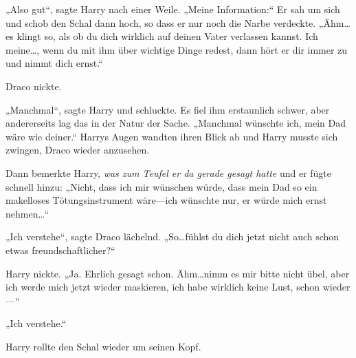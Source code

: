 „Also gut“, sagte Harry nach einer Weile. „Meine Information:“ Er sah um sich und schob den Schal dann hoch, so dass er nur noch die Narbe verdeckte. „Ähm…es klingt so, als ob du dich wirklich auf deinen Vater verlassen kannst. Ich meine…, wenn du mit ihm über wichtige Dinge redest, dann hört er dir immer zu und nimmt dich ernst.“

Draco nickte.

„Manchmal“, sagte Harry und schluckte. Es fiel ihm erstaunlich schwer, aber andererseits lag das in der Natur der Sache. „Manchmal wünschte ich, mein Dad wäre wie deiner.“ Harrys Augen wandten ihren Blick ab und Harry musste sich zwingen, Draco wieder anzusehen.

Dann bemerkte Harry, \emph{was zum Teufel er da gerade gesagt hatte} und er fügte schnell hinzu: „Nicht, dass ich mir wünschen würde, dass mein Dad so ein makelloses Tötungsinstrument wäre—ich wünschte nur, er würde mich ernst nehmen…“

„Ich verstehe“, sagte Draco lächelnd. „So…fühlst du dich jetzt nicht auch schon etwas freundschaftlicher?“

Harry nickte. „Ja. Ehrlich gesagt schon. Ähm…nimm es mir bitte nicht übel, aber ich werde mich jetzt wieder maskieren, ich habe wirklich keine Lust, schon wieder—“

„Ich verstehe.“

Harry rollte den Schal wieder um seinen Kopf.

